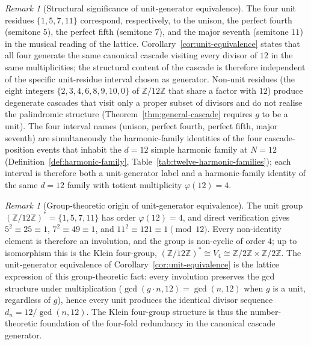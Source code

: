 \documentclass[11pt,a4paper]{article}
\theoremstyle{definition}
\theoremstyle{remark}
\newtheorem{remark}[theorem]{Remark}
\begin{document}
\begin{remark}[Structural significance of unit-generator equivalence]\label{rem:unit-equiv}
The four unit residues $\{1,5,7,11\}$ correspond, respectively, to the unison, the perfect fourth (semitone $5$), the perfect fifth (semitone $7$), and the major seventh (semitone $11$) in the musical reading of the lattice. Corollary~\ref{cor:unit-equivalence} states that all four generate the same canonical cascade visiting every divisor of $12$ in the same multiplicities; the structural content of the cascade is therefore independent of the specific unit-residue interval chosen as generator. Non-unit residues (the eight integers $\{2,3,4,6,8,9,10,0\}$ of $\mathbb{Z}/12\mathbb{Z}$ that share a factor with $12$) produce degenerate cascades that visit only a proper subset of divisors and do not realise the palindromic structure (Theorem~\ref{thm:general-cascade} requires $g$ to be a unit). The four interval names (unison, perfect fourth, perfect fifth, major seventh) are simultaneously the harmonic-family identities of the four cascade-position events that inhabit the $d=12$ simple harmonic family at $N=12$ (Definition~\ref{def:harmonic-family}, Table~\ref{tab:twelve-harmonic-families}); each interval is therefore both a unit-generator label and a harmonic-family identity of the same $d=12$ family with totient multiplicity $\varphi(12)=4$.
\end{remark}

\begin{remark}[Group-theoretic origin of unit-generator equivalence]\label{rem:klein-four}
The unit group $(\mathbb{Z}/12\mathbb{Z})^{*} = \{1,5,7,11\}$ has order $\varphi(12) = 4$, and direct verification gives $5^{2} \equiv 25 \equiv 1$, $7^{2} \equiv 49 \equiv 1$, and $11^{2} \equiv 121 \equiv 1 \pmod{12}$. Every non-identity element is therefore an involution, and the group is non-cyclic of order $4$; up to isomorphism this is the Klein four-group, $(\mathbb{Z}/12\mathbb{Z})^{*} \cong V_{4} \cong \mathbb{Z}/2\mathbb{Z} \times \mathbb{Z}/2\mathbb{Z}$. The unit-generator equivalence of Corollary~\ref{cor:unit-equivalence} is the lattice expression of this group-theoretic fact: every involution preserves the gcd structure under multiplication ($\gcd(g \cdot n, 12) = \gcd(n, 12)$ when $g$ is a unit, regardless of $g$), hence every unit produces the identical divisor sequence $d_{n} = 12/\gcd(n,12)$. The Klein four-group structure is thus the number-theoretic foundation of the four-fold redundancy in the canonical cascade generator.
\end{remark}
\end{document}
